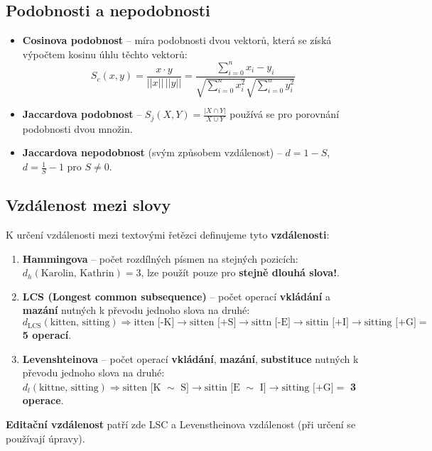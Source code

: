\subsection{Podobnosti a nepodobnosti}
\begin{itemize}
    \item \textbf{Cosinova podobnost} -- míra podobnosti dvou vektorů, která se získá výpočtem kosinu úhlu těchto vektorů:
          \begin{equation*}
              S_c(x, y) = \frac{x \cdot y}{||x|| \, ||y||} = \frac{\sum_{i = 0}^{n} x_i - y_i}{\sqrt{\sum_{i = 0}^{n} x_i^2} \sqrt{\sum_{i = 0}^{n} y_i^2}}
          \end{equation*}
    \item \textbf{Jaccardova podobnost} -- $S_j(X, Y) = \frac{|X \cap Y|}{X \cup Y}$ používá se pro porovnání podobnosti dvou množin.
    \item \textbf{Jaccardova nepodobnost} (svým způsobem vzdálenost) -- $d = 1 - S$, $d = \frac{1}{S} - 1$ pro $S \neq 0$.
\end{itemize}

\subsection{Vzdálenost mezi slovy}
K určení vzdálenosti mezi textovými řetězci definujeme tyto \textbf{vzdálenosti}:
\begin{enumerate}
    \item \textbf{Hammingova} -- počet rozdílných písmen na stejných pozicích: $d_h(\textrm{Karolin, Kathrin}) = 3$, lze použít pouze pro \textbf{stejně dlouhá slova!}.
    \item \textbf{LCS (Longest common subsequence)} -- počet operací \textbf{vkládání} a \textbf{mazání} nutných k převodu jednoho slova na druhé: $d_{\textrm{LCS}	}(\textrm{kitten, sitting}) \Rightarrow \textrm{itten [-K]} \rightarrow \textrm{sitten [+S]} \rightarrow \textrm{sittn [-E]} \rightarrow \textrm{sittin [+I]} \rightarrow \textrm{sitting [+G]} =$ \textbf{5 operací}.
    \item \textbf{Levenshteinova} -- počet operací \textbf{vkládání}, \textbf{mazání}, \textbf{substituce}  nutných k převodu jednoho slova na druhé: $d_l(\textrm{kittne, sitting}) \Rightarrow \textrm{sitten [K }\sim \textrm{ S]} \rightarrow \textrm{sittin [E }\sim \textrm{ I]} \rightarrow \textrm{sitting [+G]} =$ \textbf{3 operace}.
\end{enumerate}
\textbf{Editační vzdálenost} patří zde LSC a Levenstheinova vzdálenost (při určení se používají úpravy).

